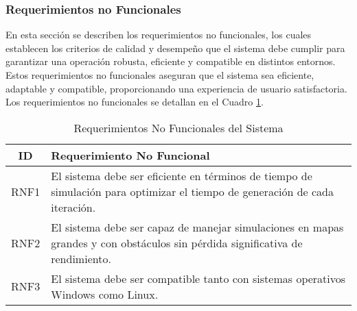 \subsubsection{Requerimientos no Funcionales}

    En esta secci\'on se describen los requerimientos no 
        funcionales, los cuales establecen los criterios de calidad y 
        desempe\~no que el sistema debe cumplir para garantizar una operaci\'on 
        robusta, eficiente y compatible en distintos entornos. Estos 
        requerimientos no funcionales aseguran que el sistema sea eficiente, 
        adaptable y compatible, proporcionando una experiencia de usuario 
        satisfactoria. Los requerimientos no funcionales se detallan en el Cuadro \ref{tab:requerimientos_no_funcionales}.
    \vskip 0.5cm
    \begin{table}[h!]
        \centering
        \begin{tabular}{|c|p{12cm}|}
        \hline
        \textbf{ID} & \textbf{Requerimiento No Funcional} \\
        \hline
        RNF1 & El sistema debe ser eficiente en t\'erminos de tiempo de simulaci\'on para optimizar el tiempo de generaci\'on de cada iteraci\'on. \\
        \hline
        RNF2 & El sistema debe ser capaz de manejar simulaciones en mapas grandes y con obst\'aculos sin p\'erdida significativa de rendimiento. \\
        \hline
        RNF3 & El sistema debe ser compatible tanto con sistemas operativos Windows como Linux. \\
        \hline
        \end{tabular}
        \caption{Requerimientos No Funcionales del Sistema}
        \label{tab:requerimientos_no_funcionales}
    \end{table}